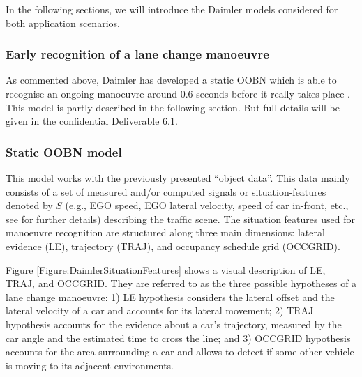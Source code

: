 In the following sections, we will introduce the Daimler models considered for both application scenarios.

\subsubsection{Early recognition of a lane change manoeuvre}\label{Section:Daimler:EarlyRecognition}

As commented above, Daimler has developed a static OOBN which is able to recognise an ongoing manoeuvre around 0.6 seconds before it really takes place \cite{kasper2012object}.  This model is partly described in the following section. But full details will be given in the confidential Deliverable 6.1.   

\subsubsection*{Static OOBN model}

This model works with the previously presented ``object data''. This data mainly consists of a set of measured and/or computed signals or situation-features denoted by $S$ (e.g., EGO speed, EGO lateral velocity, speed of car in-front, etc., see \cite{kasper2012object} for further details) describing the traffic scene. The situation features used for manoeuvre recognition are structured along three main dimensions: lateral evidence (LE), trajectory (TRAJ), and occupancy schedule grid (OCCGRID).  

Figure \ref{Figure:DaimlerSituationFeatures} shows a visual description of LE, TRAJ, and OCCGRID. They are referred to as the three possible hypotheses of a lane change manoeuvre: 1) LE hypothesis considers the lateral offset and the lateral velocity of a car and accounts for its lateral movement; 2) TRAJ hypothesis accounts for the evidence about a car's trajectory, measured by the car angle and the estimated time to cross the line; and 3) OCCGRID hypothesis accounts for the area surrounding a car and allows to detect if some other vehicle is moving to its adjacent environments.

